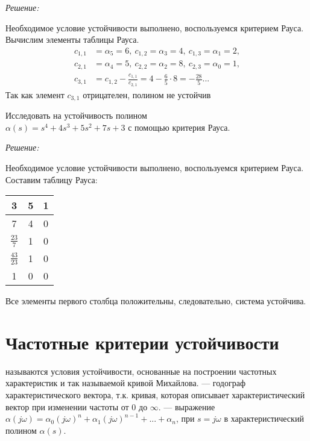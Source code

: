 \documentclass[../../TAU.tex]{subfiles}
\begin{document}
    {\it Решение:}\par
    Необходимое условие устойчивости выполнено, воспользуемся критерием Рауса. Вычислим элементы таблицы Рауса.
    \begin{align*}
        c_{1,1}&=\alpha_5=6,\ c_{1,2}=\alpha_3=4,\ c_{1,3}=\alpha_1=2, \\
        c_{2,1}&=\alpha_4=5,\ c_{2,2}=\alpha_2=8,\ c_{2,3}=\alpha_0=1, \\
        c_{3,1}&=c_{1,2}-\frac{c_{1,1}}{c_{2,1}}=4-\frac{6}{5}\cdot 8 = -\frac{28}{5}...
    \end{align*}
    Так как элемент $c_{3,1}$ отрицателен, полином не устойчив 


    \examp Исследовать на устойчивость полином\\
    $\alpha(s) = s^4+4s^3+5s^2+7s+3$ 
    с помощью критерия Рауса.

    {\it Решение:}\par
    Необходимое условие устойчивости выполнено, воспользуемся критерием Рауса. Составим таблицу Рауса:
    \begin{center}
        \begin{tabular}[h]{|c|c|c|}
            \hline
            3 & 5 & 1 \\
            \hline
            7 & 4 & 0 \\
            \hline
            $\frac{23}{7}$ & 1 & 0 \\
            \hline
            $\frac{43}{23}$ & 1 & 0 \\
            \hline
            1 & 0 & 0 \\
            \hline
        \end{tabular}
    \end{center}
    Все элементы первого столбца положительны, следовательно, система устойчива.

\section{Частотные критерии устойчивости}

     называются условия устойчивости, основанные на построении частотных характеристик и так называемой кривой Михайлова.
     --- годограф характеристического вектора, т.к. кривая, которая описывает характеристический вектор при изменении частоты от $0$ до $\infty$.
     --- выражение 
    $\alpha(j \omega)=\alpha_0(j \omega)^n+\alpha_1(j \omega)^{n-1}+...+\alpha_n$, при $s=j \omega$ в характеристический полином $\alpha(s)$.
\end{document}
